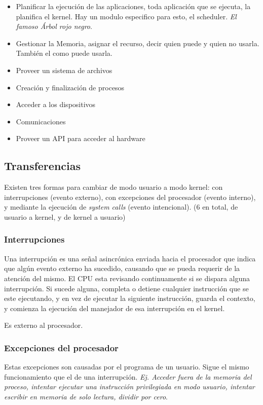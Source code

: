 \documentclass[titlepage,a4paper]{article}
\begin{document}
\begin{itemize}
    \item Planificar la ejecución de las aplicaciones, toda aplicación que se ejecuta, la planifica el kernel. Hay un modulo especifico para esto, el scheduler. \textit{El famoso Árbol rojo negro}.
    \item Gestionar la Memoria, asignar el recurso, decir quien puede y quien no usarla. También el como puede usarla.
    \item Proveer un sistema de archivos
    \item Creación y finalización de procesos
    \item Acceder a los dispositivos
    \item Comunicaciones
    \item Proveer un API para acceder al hardware
\end{itemize}

\subsection*{Transferencias}
Existen tres formas para cambiar de modo usuario a modo kernel: con interrupciones (evento externo), con excepciones del procesador (evento interno), y mediante la ejecución de \textit{system calls} (evento intencional). (6 en total, de usuario a kernel, y de kernel a usuario)

\subsubsection*{Interrupciones}

Una interrupción es una señal asincrónica enviada hacia el procesador que indica que algún evento externo ha sucedido, causando que se pueda requerir de la atención del mismo. El CPU esta revisando continuamente si se dispara alguna interrupción. Si sucede alguna, completa o detiene cualquier instrucción que se este ejecutando, y en vez de ejecutar la siguiente instrucción, guarda el contexto, y comienza la ejecución del manejador de esa interrupción en el kernel.

Es externo al procesador.

\subsubsection*{Excepciones del procesador}

Estas excepciones son causadas por el programa de un usuario. Sigue el mismo funcionamiento que el de una interrupción. \textit{Ej. Acceder fuera de la memoria del proceso, intentar ejecutar una instrucción privilegiada en modo usuario, intentar escribir en memoria de solo lectura, dividir por cero}.
\end{document}

